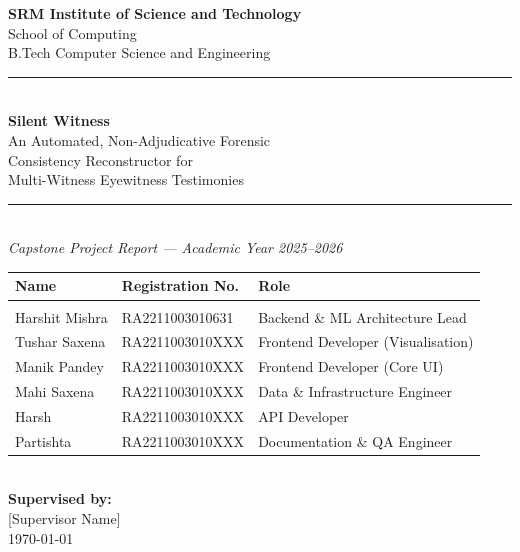 \documentclass[12pt,a4paper]{report}
\begin{document}
\begin{titlepage}
\centering
\vspace*{1.5cm}
{\Large \textbf{SRM Institute of Science and Technology}}\\[0.3cm]
{\large School of Computing}\\[0.3cm]
{\large B.Tech Computer Science and Engineering}\\[2cm]
\rule{\linewidth}{1.5pt}\\[0.4cm]
{\Huge \textbf{Silent Witness}}\\[0.3cm]
{\LARGE An Automated, Non-Adjudicative Forensic}\\[0.2cm]
{\LARGE Consistency Reconstructor for}\\[0.2cm]
{\LARGE Multi-Witness Eyewitness Testimonies}\\[0.4cm]
\rule{\linewidth}{1.5pt}\\[1.5cm]
{\large \textit{Capstone Project Report — Academic Year 2025--2026}}\\[2cm]
\begin{tabular}{lll}
\textbf{Name} & \textbf{Registration No.} & \textbf{Role} \\[0.3cm]
\hline\\
Harshit Mishra     & RA2211003010631 & Backend \& ML Architecture Lead \\[0.4cm]
Tushar Saxena      & RA2211003010XXX & Frontend Developer (Visualisation) \\[0.4cm]
Manik Pandey       & RA2211003010XXX & Frontend Developer (Core UI) \\[0.4cm]
Mahi Saxena        & RA2211003010XXX & Data \& Infrastructure Engineer \\[0.4cm]
Harsh              & RA2211003010XXX & API Developer \\[0.4cm]
Partishta          & RA2211003010XXX & Documentation \& QA Engineer \\[0.4cm]
\end{tabular}\\[1.5cm]
{\large \textbf{Supervised by:}}\\[0.3cm]
{\large [Supervisor Name]}\\[2cm]
{\large \today}
\end{titlepage}

\end{document}
